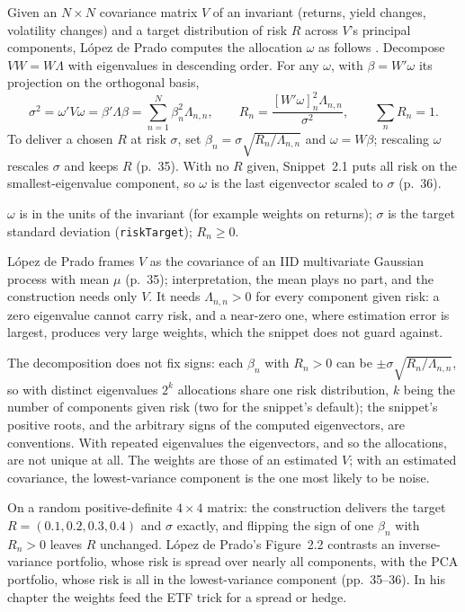 \begin{qfmodel}\label{mod:pca-risk-distribution-weights}
 Given an $N\times N$ covariance matrix $V$ of an invariant (returns, yield changes, volatility changes) and a target distribution of risk $R$ across $V$'s principal components, López de Prado computes the allocation $\omega$ as follows \citep[chap.~2, sec.~2.4.2, p.~35]{alpha-afml}. Decompose $VW=W\Lambda$ with eigenvalues in descending order. For any $\omega$, with $\beta=W'\omega$ its projection on the orthogonal basis,
\[ \sigma^2=\omega'V\omega=\beta'\Lambda\beta=\sum_{n=1}^N\beta_n^2\Lambda_{n,n},\qquad R_n=\frac{[W'\omega]_n^2\Lambda_{n,n}}{\sigma^2},\qquad \sum_nR_n=1. \]
To deliver a chosen $R$ at risk $\sigma$, set $\beta_n=\sigma\sqrt{R_n/\Lambda_{n,n}}$ and $\omega=W\beta$; rescaling $\omega$ rescales $\sigma$ and keeps $R$ (p.~35). With no $R$ given, Snippet~2.1 puts all risk on the smallest-eigenvalue component, so $\omega$ is the last eigenvector scaled to $\sigma$ (p.~36).

 $\omega$ is in the units of the invariant (for example weights on returns); $\sigma$ is the target standard deviation (\texttt{riskTarget}); $R_n\ge0$.

 López de Prado frames $V$ as the covariance of an IID multivariate Gaussian process with mean $\mu$ (p.~35); interpretation, the mean plays no part, and the construction needs only $V$. It needs $\Lambda_{n,n}>0$ for every component given risk: a zero eigenvalue cannot carry risk, and a near-zero one, where estimation error is largest, produces very large weights, which the snippet does not guard against.

The decomposition does not fix signs: each $\beta_n$ with $R_n>0$ can be $\pm\sigma\sqrt{R_n/\Lambda_{n,n}}$, so with distinct eigenvalues $2^k$ allocations share one risk distribution, $k$ being the number of components given risk (two for the snippet's default); the snippet's positive roots, and the arbitrary signs of the computed eigenvectors, are conventions. With repeated eigenvalues the eigenvectors, and so the allocations, are not unique at all. The weights are those of an estimated $V$; with an estimated covariance, the lowest-variance component is the one most likely to be noise.

 On a random positive-definite $4\times4$ matrix: the construction delivers the target $R=(0.1,0.2,0.3,0.4)$ and $\sigma$ exactly, and flipping the sign of one $\beta_n$ with $R_n>0$ leaves $R$ unchanged. López de Prado's Figure~2.2 contrasts an inverse-variance portfolio, whose risk is spread over nearly all components, with the PCA portfolio, whose risk is all in the lowest-variance component (pp.~35--36). In his chapter the weights feed the ETF trick for a spread or hedge.


\end{qfmodel}
